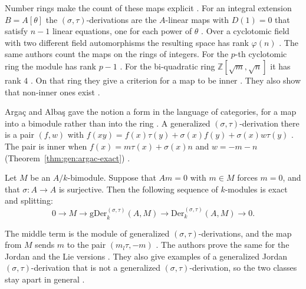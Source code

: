 Number rings make the count of these maps explicit
\cite[p.~9]{ManjuSharma2026Twisted}. For an integral extension $B=A[\theta]$
the $(\sigma,\tau)$-derivations are the $A$-linear maps with $D(1)=0$ that
satisfy $n-1$ linear equations, one for each power of $\theta$
\cite[Theorem~3.2, p.~9]{ManjuSharma2026Twisted}. Over a cyclotomic field with
two different field automorphisms the resulting space has rank $\varphi(n)$
\cite[Corollary~3.5, p.~11]{ManjuSharma2026Twisted}. The same authors count
the maps on the rings of integers. For the $p$-th cyclotomic ring the module
has rank $p-1$ \cite[Corollary~3.9, p.~17]{ManjuSharma2026NumberRings}. For
the bi-quadratic ring $\mathbb{Z}[\sqrt{m},\sqrt{n}]$ it has rank $4$
\cite[Corollary~3.19, p.~24]{ManjuSharma2026NumberRings}. On that ring they
give a criterion for a map to be inner \cite[Theorem~3.22,
p.~25]{ManjuSharma2026NumberRings}. They also show that non-inner ones exist
\cite[Corollary~3.24, p.~26]{ManjuSharma2026NumberRings}.

Arga\c{c} and Alba\c{s} gave the notion a form in the language of categories, for a map into a
bimodule rather than into the ring \cite[p.~977]{ArgacAlbas2002}. A generalized
$(\sigma,\tau)$-derivation there is a pair $(f,w)$ with
$f(xy)=f(x)\tau(y)+\sigma(x)f(y)+\sigma(x)w\tau(y)$
\cite[(2.6), p.~978]{ArgacAlbas2002}. The pair is inner when
$f(x)=m\tau(x)+\sigma(x)n$ and $w=-m-n$ (Theorem~\ref{thm:gen:argac-exact})
\cite[(2.9), p.~978]{ArgacAlbas2002}.\begin{theorem}\label{thm:gen:argac-exact}
Let $M$ be an $A/k$-bimodule. Suppose that $Am=0$ with $m\in M$ forces $m=0$, and
that $\sigma\colon A\to A$ is surjective. Then the following sequence of
$k$-modules is exact and splitting:
\begin{equation*}
0\longrightarrow M\longrightarrow \mathrm{gDer}^{(\sigma,\tau)}_{k}(A,M)
\longrightarrow \mathrm{Der}^{(\sigma,\tau)}_{k}(A,M)\longrightarrow 0 .
\end{equation*}
\end{theorem}

The middle term is the module of generalized $(\sigma,\tau)$-derivations, and
the map from $M$ sends $m$ to the pair $(m_{l}\tau,-m)$ \cite[Theorem~3.1,
p.~979]{ArgacAlbas2002}. The authors prove the same for the Jordan and the Lie
versions \cite[Theorems~4.1 and~4.2, pp.~981--982]{ArgacAlbas2002}. They also
give examples of a generalized Jordan $(\sigma,\tau)$-derivation that is not a
generalized $(\sigma,\tau)$-derivation, so the two classes stay apart in
general \cite[Examples~4.1 and~4.3, pp.~982--983]{ArgacAlbas2002}.

